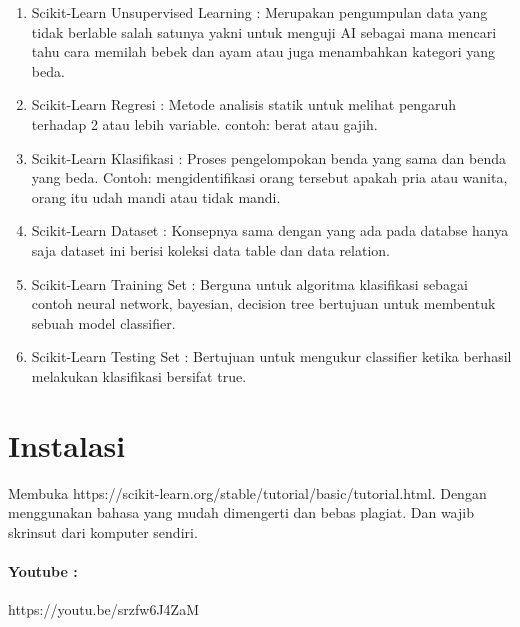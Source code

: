 \begin{enumerate}
\begin{enumerate}
              \item Scikit-Learn Unsupervised Learning : Merupakan pengumpulan data yang tidak berlable salah satunya yakni untuk menguji AI sebagai mana mencari tahu cara memilah bebek dan ayam atau juga menambahkan kategori yang beda.

              \item Scikit-Learn Regresi : Metode analisis statik untuk melihat pengaruh terhadap 2 atau lebih variable. contoh: berat atau gajih.

              \item Scikit-Learn Klasifikasi : Proses pengelompokan benda yang sama dan benda yang beda. Contoh: mengidentifikasi orang tersebut apakah pria atau wanita, orang itu udah mandi atau tidak mandi.

              \item Scikit-Learn Dataset : Konsepnya sama dengan yang ada pada databse hanya saja dataset ini berisi koleksi data table dan data relation.

              \item Scikit-Learn Training Set : Berguna untuk algoritma klasifikasi sebagai contoh neural network, bayesian, decision tree bertujuan untuk membentuk sebuah model classifier.

              \item Scikit-Learn Testing Set : Bertujuan untuk mengukur classifier ketika berhasil melakukan klasifikasi bersifat true.
          \end{enumerate}
\end{enumerate}

\section{Instalasi}
Membuka https://scikit-learn.org/stable/tutorial/basic/tutorial.html. Dengan menggunakan bahasa yang mudah dimengerti dan bebas plagiat. Dan wajib skrinsut dari komputer sendiri.

\paragraph{\textbf Youtube :} https://youtu.be/srzfw6J4ZaM

